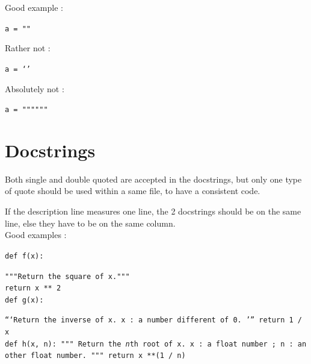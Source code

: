 \documentclass[a4paper,10pt]{report}
\begin{document}
   \noindent Good example :
   
   \texttt{a = ""}
   
   \noindent Rather not :
   
   \texttt{a = `'}
   
   \noindent Absolutely not :
   
   \texttt{a = """"""}
  
  
  
  \section{Docstrings}
   Both single and double quoted are accepted in the docstrings, but only one type of quote should be used within a same file, to have a consistent code.
   
   If the description line measures one line, the 2 docstrings should be on the same line, else they have to be on the same column. \\
   
   \noindent Good examples :
   
   \texttt{def f(x):}
   
   \indent \indent \texttt{"""Return the square of x."""} \\
   
   \indent \indent \texttt{return x ** 2} \\
   
   \texttt{def g(x):}
   
   \indent \indent \texttt{```Return the inverse of x. \newline
	   \indent \indent x : a number different of 0. \newline
	   \indent \indent''' \newline \newline
	   \indent \indent return 1 / x} \\
   
   \texttt{def h(x, n): \newline
	   \indent \indent """\newline 
	   \indent \indent Return the \emph{n}th root of x. \newline \newline
	   \indent \indent x : a float number ; \newline
	   \indent \indent n : an other float number. \newline
	   \indent \indent """ \newline \newline
	   \indent \indent return x **(1 / n)} \newline \newline
   
\end{document}
